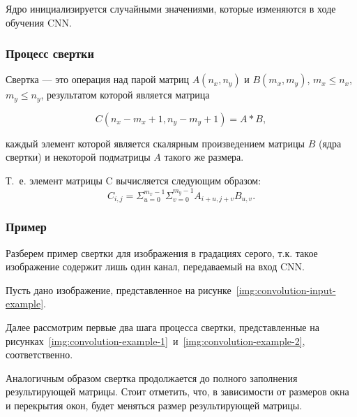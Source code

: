 Ядро инициализируется случайными значениями, которые изменяются в ходе обучения CNN.

\subsubsection*{Процесс свертки}

Свертка --- это операция над парой матриц $A(n_x, n_y)$ и $B(m_x, m_y)$, $m_x  \le n_x$, $m_y \le n_y$, результатом которой является матрица 

\begin{equation}
C(n_x - m_x +1, n_y - m_y + 1) = A * B,
\end{equation}

каждый элемент которой является скалярным произведением матрицы $B$ (ядра свертки) и некоторой подматрицы $A$ такого же размера.

Т.~е. элемент матрицы C вычисляется следующим образом:
\begin{equation}
C_{i,j} = \Sigma_{u=0}^{m_x-1} \Sigma_{v=0}^{m_y-1} A_{i+u,j+v}B_{u,v}.
\end{equation}

\subsubsection*{Пример}

Разберем пример свертки для изображения в градациях серого, т.к. такое изображение содержит лишь один канал, передаваемый на вход CNN.

Пусть дано изображение, представленное на рисунке~\ref{img:convolution-input-example}.


Далее рассмотрим первые два шага процесса свертки, представленные на рисунках~\ref{img:convolution-example-1}~и~\ref{img:convolution-example-2}, соответственно.



Аналогичным образом свертка продолжается до полного заполнения результирующей матрицы. Стоит отметить, что, в зависимости от размеров окна и перекрытия окон, будет меняться размер результирующей матрицы.

